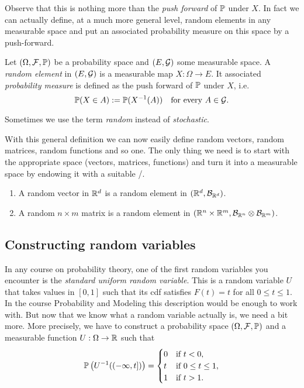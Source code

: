 Observe that this is nothing more than the \emph{push forward} of $\mathbb P$ under $X$. In fact we can actually define, at a much more general level, random elements in any measurable space and put an associated probability measure on this space by a push-forward.

\begin{definition}
Let $(\Omega,\mathcal F, \mathbb P)$ be a probability space and $(E,\mathcal G)$ some measurable space. A \emph{random element} in $(E,\mathcal G)$ is a measurable map $X : \Omega \to E$. It associated \emph{probability measure} is defined as the push forward of $\mathbb P$ under $X$, i.e.
\[
	\mathbb P(X \in A) := \mathbb P(X^{-1}(A)) \quad \text{for every } A \in \mathcal G.
\]
\end{definition}

Sometimes we use the term \emph{random} instead of \emph{stochastic}. 

With this general definition we can now easily define random vectors, random matrices, random functions and so one. The only thing we need is to start with the appropriate space (vectors, matrices, functions) and turn it into a measurable space by endowing it with a suitable \sigalg/. 

\begin{example}
\hfill
\begin{enumerate}
\item A random vector in $\mathbb R^d$ is a random element in $(\mathbb R^d, \mathcal B_{\mathbb R^d})$.
\item A random $n \times m$ matrix is a random element in $(\mathbb R^n \times \mathbb R^m, \mathcal B_{\mathbb R^n} \otimes \mathcal B_{\mathbb R^m})$.
\end{enumerate}
\end{example}

\subsection{Constructing random variables}

In any course on probability theory, one of the first random variables you encounter is the \emph{standard uniform random variable}. This is a random variable $U$ that takes values in $[0,1]$ such that its cdf satisfies $F(t) = t$ for all $0\le t \le 1$. In the course Probability and Modeling this description would be enough to work with. But now that we know what a random variable actually is, we need a bit more. More precisely, we have to construct a probability space $(\Omega,\mathcal F, \mathbb P)$ and a measurable function $U : \Omega \to \mathbb R$ such that 
\begin{equation}\label{eq:cdf_uniform_rv}
	\mathbb P\left(U^{-1}((-\infty,t])\right) = \begin{cases}
		0 &\text{if } t < 0,\\
		t &\text{if } 0 \le t\le 1,\\
		1 &\text{if } t > 1.
	\end{cases}
\end{equation}

